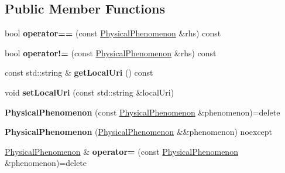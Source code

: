 \subsection*{Public Member Functions}
\begin{DoxyCompactItemize}
\item 
\mbox{\label{classomexmeta_1_1PhysicalPhenomenon_a1c3322453b3c6831668ffa98d9f4b6af}} 
bool {\bfseries operator==} (const \hyperlink{classomexmeta_1_1PhysicalPhenomenon}{Physical\+Phenomenon} \&rhs) const
\item 
\mbox{\label{classomexmeta_1_1PhysicalPhenomenon_a2c726263714e31c7c19d6e73c2c593f8}} 
bool {\bfseries operator!=} (const \hyperlink{classomexmeta_1_1PhysicalPhenomenon}{Physical\+Phenomenon} \&rhs) const
\item 
\mbox{\label{classomexmeta_1_1PhysicalPhenomenon_a2d59ebbc920a40348d102af31ed6661a}} 
const std\+::string \& {\bfseries get\+Local\+Uri} () const
\item 
\mbox{\label{classomexmeta_1_1PhysicalPhenomenon_a84cae9aa96ca00df45b0f81dd8d3ffd4}} 
void {\bfseries set\+Local\+Uri} (const std\+::string \&local\+Uri)
\item 
\mbox{\label{classomexmeta_1_1PhysicalPhenomenon_ad823dad75504adb78975c810e5f1ff94}} 
{\bfseries Physical\+Phenomenon} (const \hyperlink{classomexmeta_1_1PhysicalPhenomenon}{Physical\+Phenomenon} \&phenomenon)=delete
\item 
\mbox{\label{classomexmeta_1_1PhysicalPhenomenon_aeb95aedf1756ded154ec6753108a691e}} 
{\bfseries Physical\+Phenomenon} (\hyperlink{classomexmeta_1_1PhysicalPhenomenon}{Physical\+Phenomenon} \&\&phenomenon) noexcept
\item 
\mbox{\label{classomexmeta_1_1PhysicalPhenomenon_aac3920bfe9bf16e071ebdd8ed4fabe2f}} 
\hyperlink{classomexmeta_1_1PhysicalPhenomenon}{Physical\+Phenomenon} \& {\bfseries operator=} (const \hyperlink{classomexmeta_1_1PhysicalPhenomenon}{Physical\+Phenomenon} \&phenomenon)=delete
\item 

\end{DoxyCompactItemize}
